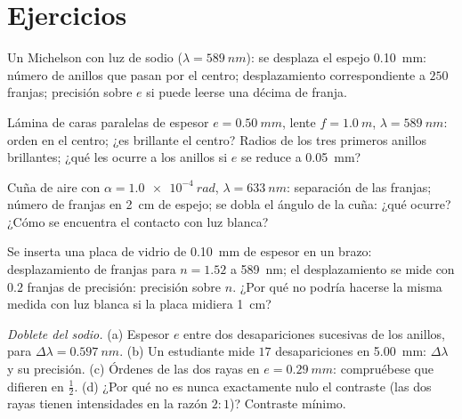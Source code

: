 \section{Ejercicios}

\begin{exercise}[$\star$]\label{exo:b2:michelson:1}
Un Michelson con luz de sodio ($\lambda = \qty{589}{nm}$): se desplaza el espejo
\qty{0.10}{mm}: número de anillos que pasan por el centro; desplazamiento
correspondiente a $250$ franjas; precisión sobre $e$ si puede leerse una décima
de franja.
\end{exercise}

\begin{exercise}[$\star$]\label{exo:b2:michelson:2}
Lámina de caras paralelas de espesor $e = \qty{0.50}{mm}$, lente $f = \qty{1.0}{m}$, $\lambda =
\qty{589}{nm}$: orden en el centro; ¿es brillante el centro? Radios de los
tres primeros anillos brillantes; ¿qué les ocurre a los anillos si $e$ se reduce
a \qty{0.05}{mm}?
\end{exercise}

\begin{exercise}[$\star$]\label{exo:b2:michelson:3}
Cuña de aire con $\alpha = \qty{1.0e-4}{rad}$, $\lambda = \qty{633}{nm}$: separación de las franjas;
número de franjas en \qty{2}{cm} de espejo; se dobla el ángulo de la cuña:
¿qué ocurre? ¿Cómo se encuentra el contacto con luz blanca?
\end{exercise}

\begin{exercise}[$\star$]\label{exo:b2:michelson:4}
Se inserta una placa de vidrio de \qty{0.10}{mm} de espesor en un brazo: desplazamiento de franjas para
$n = 1.52$ a \qty{589}{nm}; el desplazamiento se mide con $0.2$ franjas de precisión: precisión
sobre $n$. ¿Por qué no podría hacerse la misma medida con luz blanca
si la placa midiera \qty{1}{cm}?
\end{exercise}

\begin{exercise}[$\star\star$]\label{exo:b2:michelson:5}
\emph{Doblete del sodio.} (a) Espesor $e$ entre dos desapariciones
sucesivas de los anillos, para $\Delta\lambda = \qty{0.597}{nm}$. (b) Un estudiante
mide $17$ desapariciones en \qty{5.00}{mm}: $\Delta\lambda$ y su precisión.
(c) Órdenes de las dos rayas en $e = \qty{0.29}{mm}$: compruébese que difieren en
$\tfrac12$. (d) ¿Por qué no es nunca exactamente nulo el contraste (las dos rayas tienen
intensidades en la razón $2 : 1$)? Contraste mínimo.
\end{exercise}

